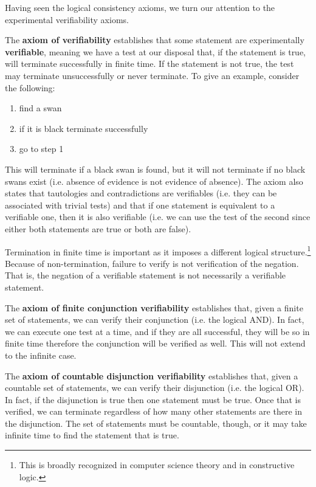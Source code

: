 \documentclass[letterpaper]{article}
\begin{document}
Having seen the logical consistency axioms, we turn our attention to the experimental verifiability axioms.

The \textbf{axiom of verifiability} establishes that some statement are experimentally \textbf{verifiable}, meaning we have a test at our disposal that, if the statement is true, will terminate successfully in finite time. If the statement is not true, the test may terminate unsuccessfully or never terminate. To give an example, consider the following:
\begin{enumerate}
	\item find a swan
	\item if it is black terminate successfully
	\item go to step 1
\end{enumerate}
This will terminate if a black swan is found, but it will not terminate if no black swans exist (i.e. absence of evidence is not evidence of absence). The axiom also states that tautologies and contradictions are verifiables (i.e. they can be associated with trivial tests) and that if one statement is equivalent to a verifiable one, then it is also verifiable (i.e. we can use the test of the second since either both statements are true or both are false).

Termination in finite time is important as it imposes a different logical structure.\footnote{This is broadly recognized in computer science theory and in constructive logic.} Because of non-termination, failure to verify is not verification of the negation. That is, the negation of a verifiable statement is not necessarily a verifiable statement.

The \textbf{axiom of finite conjunction verifiability} establishes that, given a finite set of statements, we can verify their conjunction (i.e. the logical AND). In fact, we can execute one test at a time, and if they are all successful, they will be so in finite time therefore the conjunction will be verified as well. This will not extend to the infinite case.

The \textbf{axiom of countable disjunction verifiability} establishes that, given a countable set of statements, we can verify their disjunction (i.e. the logical OR). In fact, if the disjunction is true then one statement must be true. Once that is verified, we can terminate regardless of how many other statements are there in the disjunction. The set of statements must be countable, though, or it may take infinite time to find the statement that is true.
\end{document}
